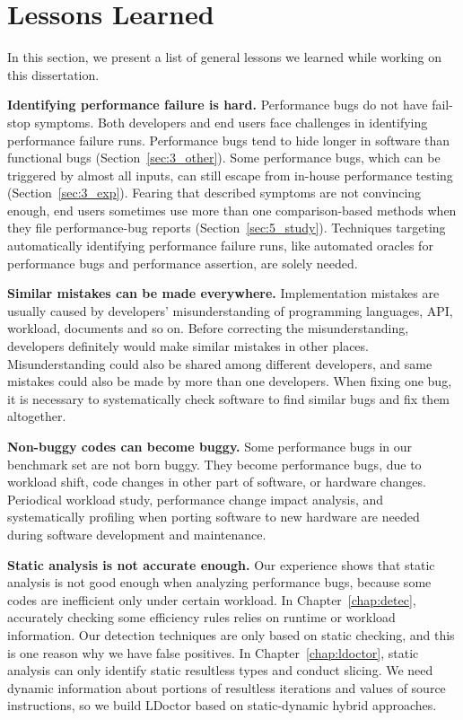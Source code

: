 \section{Lessons Learned}
\label{sec:7_lessons}

In this section, we present a list of general lessons we learned while working on this dissertation.


{\bf Identifying performance failure is hard.}
Performance bugs do not have fail-stop symptoms. 
Both developers and end users face challenges in identifying performance failure runs. 
Performance bugs tend to hide longer in software than functional bugs (Section~\ref{sec:3_other}).
Some performance bugs, which can be triggered by almost all inputs, can still escape from in-house performance testing (Section~\ref{sec:3_exp}). 
Fearing that described symptoms are not convincing enough, 
end users sometimes use more than one 
comparison-based methods when they file performance-bug reports (Section~\ref{sec:5_study}). 
Techniques targeting automatically identifying performance failure runs, 
like automated oracles for performance bugs and performance assertion, are solely needed. 

{\bf Similar mistakes can be made everywhere. }
Implementation mistakes are usually caused by developers' misunderstanding of programming languages, API, workload, documents and so on. 
Before correcting the misunderstanding, 
developers definitely would make similar mistakes in other places.
Misunderstanding could also be shared among different developers, and same mistakes could also be made by more than one developers.
When fixing one bug, it is necessary to systematically check software to find similar bugs and fix them altogether. 

{\bf Non-buggy codes can become buggy.}
Some performance bugs in our benchmark set are not born buggy. 
They become performance bugs, due to workload shift, code changes in other part of software, or hardware changes. 
Periodical workload study, performance change impact analysis, 
and systematically profiling when porting software to new hardware are needed during software development and maintenance.

{\bf Static analysis is not accurate enough.}
Our experience shows that static analysis is not good enough when analyzing performance bugs, 
because some codes are inefficient only under certain workload. 
In Chapter~\ref{chap:detec}, accurately checking some efficiency rules relies on runtime or workload information. 
Our detection techniques are only based on static checking, and this is one reason why we have false positives. 
In Chapter~\ref{chap:ldoctor}, static analysis can only identify static resultless types and conduct slicing. 
We need dynamic information about portions of resultless iterations and values of source instructions, 
so we build LDoctor based on static-dynamic hybrid approaches. 


